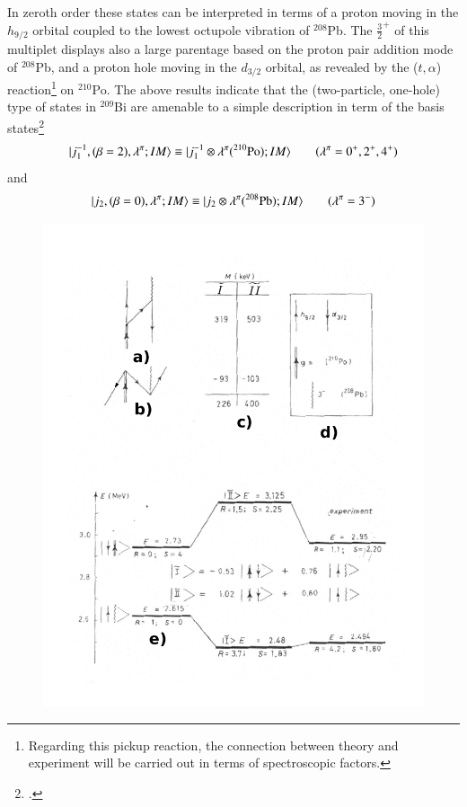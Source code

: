 In zeroth order these states can be interpreted in terms of a proton moving in the $h_{9/2}$ orbital coupled to the lowest octupole vibration of $^{208}$Pb. The $\frac{3}{2}^+$ of this multiplet displays also a large parentage based on the proton pair addition mode of $^{208}$Pb,
and a proton hole moving in the $d_{3/2}$ orbital, as revealed by the ($t,\alpha$) reaction\footnote{Regarding this pickup reaction, the connection between theory and experiment will be carried out in terms of spectroscopic factors.} 
on $^{210}$Po. 
The above results indicate that the (two-particle, one-hole) type of states 
in $^{209}$Bi are amenable to a simple description in term of the basis states\footnote{\cite{Barnes:72}.} 
  \begin{align}\label{eqC1A87} 
   |{j^{-1}_1,(\beta=2),\lambda^{\pi};IM} \rangle\equiv |{j_1^{-1}\otimes \lambda^\pi(^{210}\text{Po});IM} \rangle\qquad(\lambda^{\pi}=0^+,2^+,4^+)
    \end{align} 
and 
  \begin{align}\label{eqC1A88} 
   |{j_2,(\beta=0),\lambda^{\pi};IM} \rangle\equiv |{j_2\otimes \lambda^\pi(^{208}\text{Pb});IM} \rangle\qquad(\lambda^{\pi}=3^-)
    \end{align} 
         \begin{figure}
         \centerline {
         \includegraphics*[width=12cm]{introduccion/figs/fig24a}
         }
         \end{figure}
